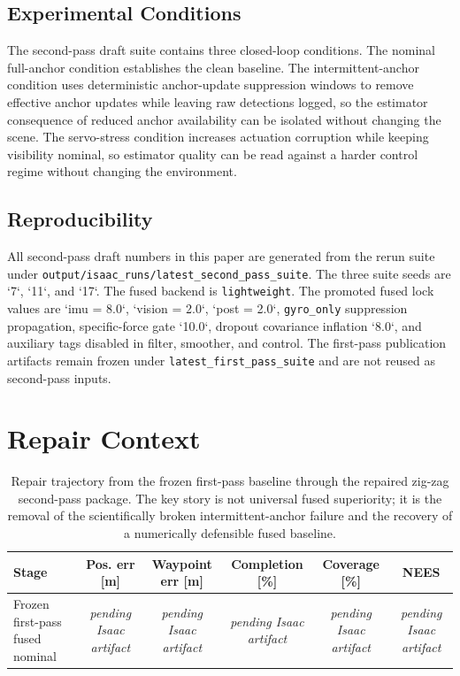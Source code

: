 \documentclass[11pt]{article}
\newcommand{\ArtifactPending}{\textit{pending Isaac artifact}}
\newcommand{\IsaacSecondPassRepairTrajectoryRows}{%
Frozen first-pass fused nominal & \ArtifactPending{} & \ArtifactPending{} & \ArtifactPending{} & \ArtifactPending{} & \ArtifactPending{} \\
}
\begin{document}
\subsection{Experimental Conditions}
The second-pass draft suite contains three closed-loop conditions. The nominal full-anchor condition establishes the clean baseline. The intermittent-anchor condition uses deterministic anchor-update suppression windows to remove effective anchor updates while leaving raw detections logged, so the estimator consequence of reduced anchor availability can be isolated without changing the scene. The servo-stress condition increases actuation corruption while keeping visibility nominal, so estimator quality can be read against a harder control regime without changing the environment.

\subsection{Reproducibility}
All second-pass draft numbers in this paper are generated from the rerun suite under \texttt{output/isaac\_runs/latest\_second\_pass\_suite}. The three suite seeds are `7`, `11`, and `17`. The fused backend is \texttt{lightweight}. The promoted fused lock values are `imu = 8.0`, `vision = 2.0`, `post = 2.0`, \texttt{gyro\_only} suppression propagation, specific-force gate `10.0`, dropout covariance inflation `8.0`, and auxiliary tags disabled in filter, smoother, and control. The first-pass publication artifacts remain frozen under \texttt{latest\_first\_pass\_suite} and are not reused as second-pass inputs.

\section{Repair Context}
\begin{table}[H]
\centering
\caption{Repair trajectory from the frozen first-pass baseline through the repaired zig-zag second-pass package. The key story is not universal fused superiority; it is the removal of the scientifically broken intermittent-anchor failure and the recovery of a numerically defensible fused baseline.}
\begin{tabular}{lccccc}
\toprule
Stage & Pos. err [m] & Waypoint err [m] & Completion [\%] & Coverage [\%] & NEES \\
\midrule
\IsaacSecondPassRepairTrajectoryRows
\bottomrule
\end{tabular}
\end{table}
\end{document}
